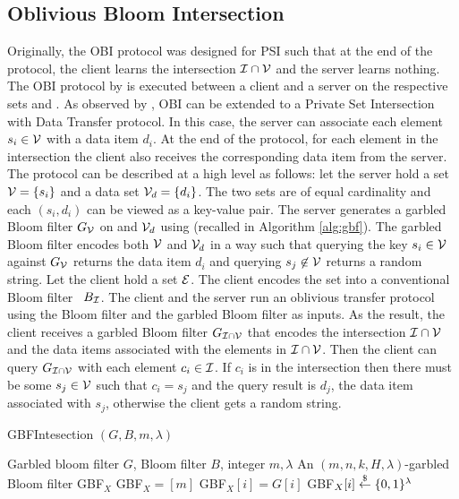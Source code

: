 \subsection{Oblivious Bloom Intersection}\label{sec:obi}
Originally, the \ac{OBI} protocol was designed for \ac{PSI} such that at the end of the protocol, the client learns the intersection $\mathcal{I}\cap \mathcal{V}$ and the server learns nothing. 
The \ac{OBI} protocol by \citet{DongCW13} is executed between a client and a server on the respective sets \ClientSet and \ServerSet. 
As observed by \citet{WenD14}, \ac{OBI} can be extended to a Private Set Intersection with Data Transfer protocol. In this case, the server can associate each element $s_i\in\mathcal{V}$ with a data item $d_i$. 
At the end of the protocol, for each element in the intersection the client also receives the corresponding data item from the server. 
The protocol can be described at a high level as follows: let the server hold a set $\mathcal{V}=\{s_i\}$ and a data set $\mathcal{V}_d=\{d_{i}\}$. The two sets are of equal cardinality and each $(s_i,d_i)$ can be viewed as a key-value pair. 
The server generates a garbled Bloom filter $G_\mathcal{V}$ on \ServerSet and $\mathcal{V}_d$ using \citet[Algorithm 1]{WenD14} (recalled in Algorithm \ref{alg:gbf}). 
The garbled Bloom filter encodes both $\mathcal{V}$ and $\mathcal{V}_d$ in a way such that querying the key $s_i\in\mathcal{V}$ against $G_\mathcal{V}$ returns the data item $d_i$ and querying $s_j\not \in \mathcal{V}$ returns a random string. Let the client hold a set $\mathcal{E}$. The client encodes the set into a conventional Bloom filter~\cite{blo70} $B_\mathcal{I}$. 
The client and the server run an oblivious transfer protocol using the Bloom filter and the garbled Bloom filter as inputs. 
As the result, the client receives a garbled Bloom filter $G_{\mathcal{I}\cap\mathcal{V}}$ that encodes the intersection $\mathcal{I}\cap \mathcal{V}$ and the data items associated with the elements in $\mathcal{I}\cap \mathcal{V}$. Then the client can query $G_{\mathcal{I}\cap\mathcal{V}}$ with each element $c_i\in\mathcal{I}$. If $c_i$ is in the intersection then there must be  some $s_j\in \mathcal{V}$ such that $c_i=s_j$ and the query result is $d_j$, the data item associated with $s_j$, otherwise the client gets a random string. 

\begin{algorithm}[htb]
\caption{GBFIntesection $(G, B, m, \lambda)$}
\label{alg:gbfintersection}
\begin{algorithmic}[1]
\REQUIRE Garbled bloom filter $G$, Bloom filter $B$, integer $m, \lambda$
\ENSURE An $(m, n, k, H, \lambda)$-garbled Bloom filter GBF$_X$
\STATE GBF$_X = [m]$ 
    \STATE GBF$_X[i] = G[i]$
  \ELSE
    \STATE GBF$_X[i] \stackrel{\$}{\gets} \{0,1\}^\lambda$
  \ENDIF
\ENDFOR
\end{algorithmic}
\end{algorithm}

